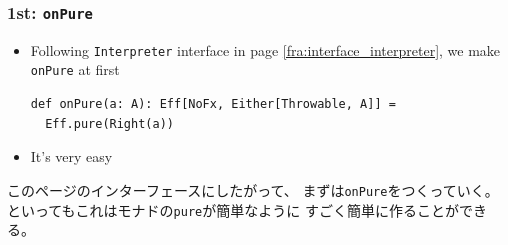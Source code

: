 \begin{frame}[fragile]
  \frametitle{1st: \lstinline|onPure|}

  \begin{itemize}
    \item<+-> Following \lstinline|Interpreter| interface in page \ref{fra:interface_interpreter},
    we make \lstinline|onPure| at first
\begin{lstlisting}[style=scala]
def onPure(a: A): Eff[NoFx, Either[Throwable, A]] =
  Eff.pure(Right(a))
\end{lstlisting}

    \item<+-> It's very easy
  \end{itemize}

  \begin{notes}
    \item このページのインターフェースにしたがって、
    まずは\lstinline|onPure|をつくっていく。
    といってもこれはモナドの\lstinline|pure|が簡単なように
    すごく簡単に作ることができる。
  \end{notes}
\end{frame}

